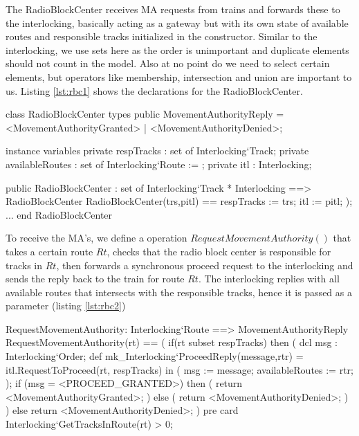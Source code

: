 \documentclass[preprint,12pt]{elsarticle}
\begin{document}
The RadioBlockCenter receives MA requests from trains and forwards these to the interlocking, basically acting as a gateway but with its own state of available routes and responsible tracks initialized in the constructor. Similar to the interlocking, we use sets here as the order is unimportant and duplicate elements should not count in the model. Also at no point do we need to select certain elements, but operators like membership, intersection and union are important to us. Listing \ref{lst:rbc1} shows the declarations for the RadioBlockCenter.

\begin{vdmsl}[label=lst:rbc1,caption=Definition of class state and constructor for RadioBlockCenter.]
	class RadioBlockCenter
	types
	public MovementAuthorityReply =
	 <MovementAuthorityGranted> | <MovementAuthorityDenied>;
	
	instance variables
	private respTracks : set of Interlocking`Track;
	private availableRoutes : set of Interlocking`Route := {};
	private itl : Interlocking;
	
	public RadioBlockCenter : set of Interlocking`Track
	* Interlocking ==> RadioBlockCenter
	RadioBlockCenter(trs,pitl) ==
		respTracks := trs;
		itl := pitl;
	);
	...
	end RadioBlockCenter
\end{vdmsl}

To receive the MA's, we define a operation $RequestMovementAuthority()$ that takes a certain route $Rt$, checks that the radio block center is responsible for tracks in $Rt$, then forwards a synchronous proceed request to the interlocking and sends the reply back to the train for route $Rt$. The interlocking replies with all available routes that intersects with the responsible tracks, hence it is passed as a parameter (listing \ref{lst:rbc2})

\begin{vdmsl}[label=lst:rbc2,caption=Definition of the public.]
	RequestMovementAuthority: Interlocking`Route
	 ==> MovementAuthorityReply
	RequestMovementAuthority(rt) ==
	(
	if(rt subset respTracks) then (
		dcl msg : Interlocking`Order;
		def mk_Interlocking`ProceedReply(message,rtr)
			 = itl.RequestToProceed(rt, respTracks)
		in ( msg := message; availableRoutes := rtr; );
			if (msg = <PROCEED_GRANTED>)
				then ( return <MovementAuthorityGranted>; )
			else (
				return <MovementAuthorityDenied>;
			)
		) else return <MovementAuthorityDenied>;
	) pre card Interlocking`GetTracksInRoute(rt) > 0;
\end{vdmsl}
\end{document}
